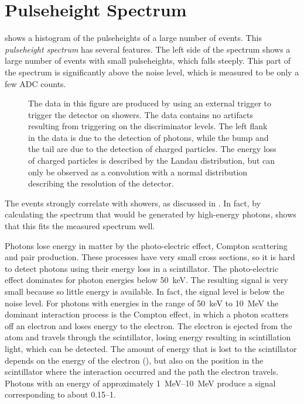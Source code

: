 \section{Pulseheight Spectrum}
\label{sec:features-pulseheight-spectrum}

 shows a histogram of the pulseheights of a large
number of \hisparc events. This \emph{pulseheight spectrum} has several
features.  The left side of the spectrum shows a large number of events with
small pulseheights, which falls steeply. This part of the spectrum is
significantly above the noise level, which is measured to be only a few ADC
counts.
\begin{figure}
\centering

\caption{  The data in this
figure are produced by using an external trigger to trigger the detector on
showers.  The data contains no artifacts resulting from triggering on
the discriminator levels.  The left flank in the data is due to the detection
of photons, while the bump and the tail are due to the detection of
charged particles.  The energy loss of charged particles is described by
the Landau distribution, but can only be observed as a convolution with a
normal distribution describing the resolution of the detector.}
\label{fig:spectrum-features}
\end{figure}
The events strongly correlate with showers, as discussed in
\cite{Pennink:2010}.  In fact, by calculating the spectrum that would be
generated by high-energy photons, \cite{Pennink:2010} shows that this fits the
measured spectrum well.

Photons lose energy in matter by the photo-electric effect, Compton scattering
and pair production.  These processes have very small cross sections, so it is
hard to detect photons using their energy loss in a scintillator.  The
photo-electric effect dominates for photon energies below
\SI{50}{\kilo\electronvolt}.  The resulting signal is very small
because so little energy is available.  In fact, the signal level is below the
noise level.
For photons with energies in the range of \SI{50}{\kilo\electronvolt} to
\SI{10}{\mega\electronvolt} the dominant interaction process is the Compton
effect, in which a photon scatters off an electron and loses energy to the electron.
The electron is ejected from the atom and travels through the scintillator,
losing energy resulting in scintillation light, which can be detected.  The
amount of energy that is lost to the scintillator depends on the energy of the
electron (), but also on the position in the
scintillator where the interaction occurred and the path the electron travels.
Photons with an energy of approximately \SIrange{1}{10}{\mega\electronvolt}
produce a signal corresponding to about \SIrange{0.15}{1}{\mip}.

